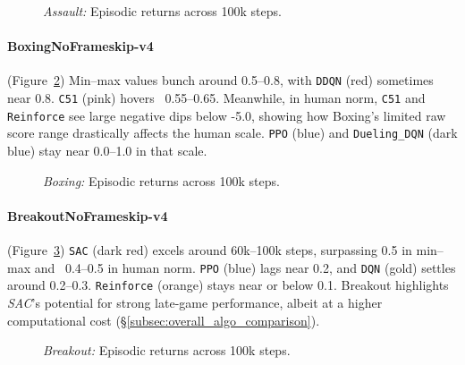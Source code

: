 \begin{figure} 
	\centering
	\quad
	\caption{\emph{Assault:} Episodic returns across 100k steps.}
	\label{fig:assault_comparison_combined}
\end{figure}

\paragraph{BoxingNoFrameskip-v4}
(Figure~\ref{fig:boxing_comparison_combined})
Min--max values bunch around 0.5--0.8, with \texttt{DDQN} (red) sometimes near 0.8. 
\texttt{C51} (pink) hovers ~0.55--0.65. Meanwhile, in human norm, 
\texttt{C51} and \texttt{Reinforce} see large negative dips below -5.0, 
showing how Boxing's limited raw score range drastically affects the human scale. 
\texttt{PPO} (blue) and \texttt{Dueling\_DQN} (dark blue) stay near 0.0--1.0 
in that scale.

\begin{figure} 
	\centering
	\quad
	\caption{\emph{Boxing:} Episodic returns across 100k steps.}
	\label{fig:boxing_comparison_combined}
\end{figure}

\paragraph{BreakoutNoFrameskip-v4}
(Figure~\ref{fig:breakout_comparison_combined})
\texttt{SAC} (dark red) excels around 60k--100k steps, surpassing 0.5 in min--max 
and ~0.4--0.5 in human norm. \texttt{PPO} (blue) lags near 0.2, and \texttt{DQN} (gold) 
settles around 0.2--0.3. 
\texttt{Reinforce} (orange) stays near or below 0.1. 
Breakout highlights \emph{SAC}'s potential for strong late-game performance, 
albeit at a higher computational cost (\S\ref{subsec:overall_algo_comparison}).
\begin{figure} 
	\centering
	\quad
	\caption{\emph{Breakout:} Episodic returns across 100k steps.}
	\label{fig:breakout_comparison_combined}
\end{figure}

